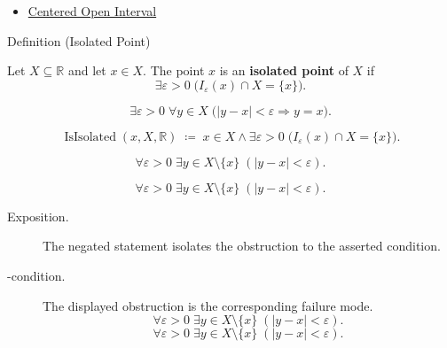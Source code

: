 \begin{dependencies}
\begin{itemize}
  \item \hyperref[def:epsilon-neighbourhood]{Centered Open Interval}
\end{itemize}
\end{dependencies}

\begin{definitionbox}{Definition (Isolated Point)}
\begin{definition}
\label{def:isolated-point-r}
Let $X\subseteq\mathbb{R}$ and let $x\in X$. The point $x$ is an
\textbf{isolated point} of $X$ if
\[
  \exists\varepsilon>0\;\bigl(I_\varepsilon(x)\cap X=\{x\}\bigr).
\]
\end{definition}
\end{definitionbox}

\begin{remark*}
\[
  \exists\varepsilon>0\;\forall y\in X\;\bigl(|y-x|<\varepsilon\Rightarrow y=x\bigr).
\]
\end{remark*}

\begin{remark*}
\[
  \operatorname{IsIsolated}(x,X,\mathbb{R})
  \;\coloneqq\;
  x\in X\wedge\exists\varepsilon>0\;\bigl(I_\varepsilon(x)\cap X=\{x\}\bigr).
\]
\end{remark*}

\begin{remark*}
\[
  \forall\varepsilon>0\;\exists y\in X\setminus\{x\}\;(|y-x|<\varepsilon).
\]
\end{remark*}

\begin{remark*}
\[
  \forall\varepsilon>0\;\exists y\in X\setminus\{x\}\;(|y-x|<\varepsilon).
\]
\end{remark*}

\begin{remark*}
\begin{description}
  \item[Exposition.]
  The negated statement isolates the obstruction to the asserted condition.

  \item[\exists-condition.]
  The displayed obstruction is the corresponding failure mode.
  \[
  \forall\varepsilon>0\;\exists y\in X\setminus\{x\}\;(|y-x|<\varepsilon).
\]
  \[
  \forall\varepsilon>0\;\exists y\in X\setminus\{x\}\;(|y-x|<\varepsilon).
\]
\end{description}
\end{remark*}



